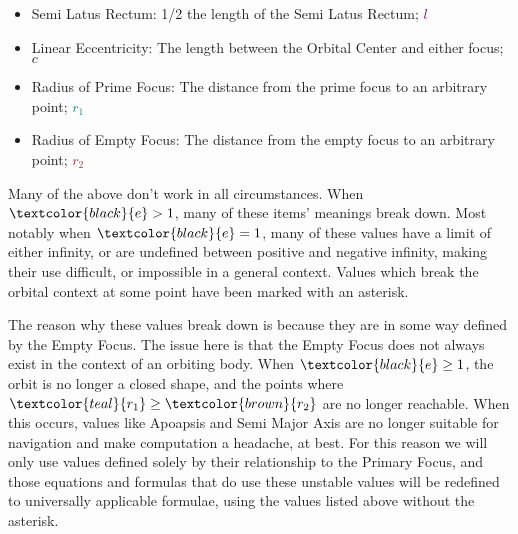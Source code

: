\begin{itemize}
    \item Semi Latus Rectum: 1/2 the length of the Semi Latus Rectum;  \textcolor{purple}{$l$}
    \item Linear Eccentricity\aster: The length between the Orbital Center and either focus; \textcolor{OliveGreen}{$c$}
    \item Radius of Prime Focus: The distance from the prime focus to an arbitrary point; \textcolor{teal}{$r_1$}
    \item Radius of Empty Focus\aster: The distance from the empty focus to an arbitrary point; \textcolor{brown}{$r_2$}\\
\end{itemize}


Many of the above don't work in all circumstances. When $\textcolor{black}{e} > 1$, many of these items' meanings break down. Most notably when $\textcolor{black}{e} = 1$, many of these values have a limit of either infinity, or are undefined between positive and negative infinity, making their use difficult, or impossible in a general context. Values which break the orbital context at some point have been marked with an asterisk.

The reason why these values break down is because they are in some way defined by the Empty Focus. The issue here is that the Empty Focus does not always exist in the context of an orbiting body. When $\textcolor{black}{e}\geq1$, the orbit is no longer a closed shape, and the points where $\textcolor{teal}{r_1} \geq \textcolor{brown}{r_2}$ are no longer reachable. When this occurs, values like Apoapsis and Semi Major Axis are no longer suitable for navigation and make computation a headache, at best. For this reason we will only use values defined solely by their relationship to the Primary Focus, and those equations and formulas that do use these unstable values will be redefined to universally applicable formulae, using the values listed above without the asterisk.
